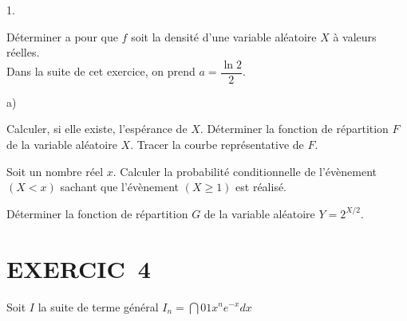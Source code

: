 \documentclass[11pt]{article}%
\begin{document}
\begin{noliste}{1.}
 \setlength{\itemsep}{4mm}
\item Déterminer a pour que $f$ soit la densité d'une variable
aléatoire $X$ 
à valeurs réelles. \\
Dans la suite de cet exercice, on prend $a = \dfrac{\ln 2}{2}$.

\item 

\begin{noliste}{a)}
 \setlength{\itemsep}{2mm}
\item Calculer, si elle existe, l'espérance de $X$. Déterminer la
fonction
de répartition $F$ de la variable aléatoire $X$. Tracer la courbe
représentative de $F$.

\item Soit un nombre réel $x$. Calculer la probabilité conditionnelle
de l'évènement $(X<x)$ sachant que l'évènement $(X\geq 1)$ est réalisé.
\end{noliste}

\item Déterminer la fonction de répartition $G$ de la variable
aléatoire $Y = 2^{X/2}$.
\end{noliste}

\section*{EXERCIC\E\ 4}

Soit $I$ la suite de terme général $I_{n} = \dint{0}{1}x^{n}e^{-x}dx$
\end{document}
